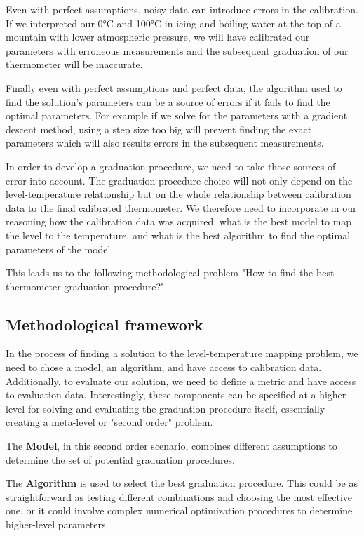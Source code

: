 \begin{bibunit}
 Even with perfect assumptions, noisy data can introduce errors in the calibration. If we interpreted our 0°C and 100°C in icing and boiling water at the top of a mountain with lower atmospheric pressure, we will have calibrated our parameters with erroneous measurements and the subsequent graduation of our thermometer will be inaccurate.

 Finally even with perfect assumptions and perfect data, the algorithm used to find the solution's parameters can be a source of errors if it fails to find the optimal parameters. For example if we solve for the parameters with a gradient descent method, using a step size too big will prevent finding the exact parameters which will also results errors in the subsequent measurements.

In order to develop a graduation procedure, we need to take those sources of error into account. The graduation procedure choice will not only depend on the level-temperature relationship but on the whole relationship between calibration data to the final calibrated thermometer. We therefore need to incorporate in our reasoning how the calibration data was acquired, what is the best model to map the level to the temperature, and what is the best algorithm to find the optimal parameters of the model.


This leads us to the following methodological problem "How to find the best thermometer graduation procedure?"

\subsection{Methodological framework}
In the process of finding a solution to the level-temperature mapping problem, we need to chose a model, an algorithm, and have access to calibration data. Additionally, to evaluate our solution, we need to define a metric and have access to evaluation data. Interestingly, these components can be specified at a higher level for solving and evaluating the graduation procedure itself, essentially creating a meta-level or "second order" problem.

The \textbf{Model}, in this second order scenario, combines different assumptions to determine the set of potential graduation procedures. 

The \textbf{Algorithm} is used to select the best graduation procedure. This could be as straightforward as testing different combinations and choosing the most effective one, or it could involve complex numerical optimization procedures to determine higher-level parameters.


\end{bibunit}
